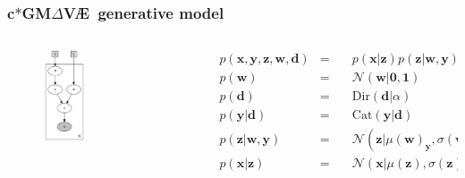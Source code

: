 \documentclass[final]{beamer}
\theoremstyle{plain}
\theoremstyle{definition}
\theoremstyle{remark}
\newcommand{\x}{\mathbf{x}}
\newcommand{\z}{\mathbf{z}}
\newcommand{\y}{\mathbf{y}}
\newcommand{\w}{\mathbf{w}}
\newcommand{\dd}{\mathbf{d}}
\newcommand{\NN}{\mathcal{N}}
\newcommand{\bv}[1]{\boldsymbol{#1}}
\newcommand{\gmvae}{c$\ast$GM$\Delta$V\AE~}
\begin{document}
\begin{frame}
\frametitle{\gmvae generative model}

\begin{columns}[T]
\begin{column}{0.5\linewidth}
\begin{figure}[h]
\centering
\includegraphics[width=0.4\textwidth]{plots/dirichlet_gmm_p.gv.png}
\end{figure}
\end{column}

\begin{column}{0.5\linewidth}
{\tiny
\begin{equation}
\label{eq:gmmfact}
\begin{aligned}
&p(\x, \y, \z, \w, \dd) &=\quad& 
p(\x | \z) p(\z | \w, \y) p(\y | \dd) p(\dd) p(\w) \\
&p(\w) &=\quad& \NN(\w | \bv{0},\bv{1}) \\
&p(\dd) &=\quad& \text{Dir}(\dd | \alpha) \\
&p(\y | \dd) &=\quad& \text{Cat}(\y | \dd) \\
&p(\z | \w, \y) &=\quad& \NN(\z | \mu(\w)_{\y}, \sigma(\w)_{\y})) \\
&p(\x | \z) &=\quad& \NN(\x | \mu(\z), \sigma(\z))
\end{aligned}
\end{equation}
}
\end{column}
\end{columns}
\end{frame}
\end{document}
